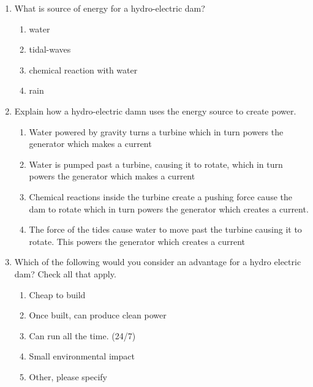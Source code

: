 \documentclass[msc,oneside]{ubcthesis}%
\begin{document}
  \begin{enumerate}
    \item What is source of energy for a hydro-electric dam?

    \begin{enumerate}
      \item water  
      \item tidal-waves    
      \item chemical reaction with water 
      \item rain

    \end{enumerate}

    \item Explain how a hydro-electric damn uses the energy source to create power.
    \begin{enumerate}
      \item Water powered by gravity turns a turbine which in turn powers the generator which makes a   current 
  
      \item Water is pumped past a turbine, causing it to rotate, which in turn powers the generator which   makes a current 
  
      \item Chemical reactions inside the turbine create a pushing force cause the dam to rotate which in  turn powers the generator which creates a current.

      \item The force of the tides cause water to move past the turbine causing it to rotate. This powers  the generator which creates a current
    \end{enumerate}

    \item Which of the following would you consider an advantage for a hydro electric dam? Check all  that apply.

        \begin{enumerate}
            \item Cheap to build
            \item Once built, can produce clean power
            \item Can run all the time. (24/7)
            \item Small environmental impact
            \item Other, please specify

        \end{enumerate}


\end{enumerate}
\end{document}
